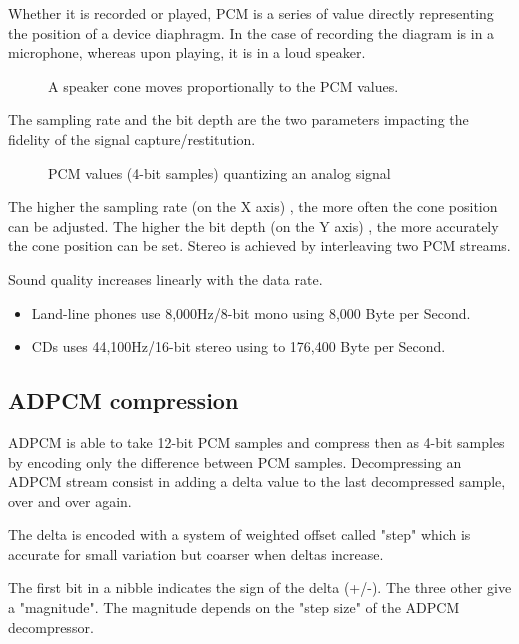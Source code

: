 Whether it is recorded or played, PCM is a series of value directly representing the position of a device diaphragm. In the case of recording the diagram is in a microphone, whereas upon playing, it is in a loud speaker.

\pagebreak

\begin{figure}[H]
\caption*{A speaker cone moves proportionally to the PCM values.}
\end{figure}


The sampling rate and the bit depth are the two parameters impacting the fidelity of the signal capture/restitution.

\begin{figure}[H]
\caption*{PCM values (4-bit samples) quantizing an analog signal}
\end{figure}


The higher the sampling rate (on the X axis) , the more often the cone position can be adjusted. The higher the bit depth (on the Y axis) , the more accurately the cone position can be set. Stereo is achieved by interleaving two PCM streams.





Sound quality increases linearly with the data rate.
\begin{itemize}[topsep=0pt]
\item Land-line phones use 8,000Hz/8-bit mono using 8,000 Byte per Second.
\item CDs uses 44,100Hz/16-bit stereo using to 176,400 Byte per Second.
\end{itemize}



\subsection{ADPCM compression}
ADPCM is able to take 12-bit PCM samples and compress then as 4-bit samples by encoding only the difference between PCM samples. Decompressing an ADPCM stream consist in adding a delta value to the last decompressed  sample, over and over again.

The delta is encoded with a system of weighted offset called "step" which is accurate for small variation but coarser when deltas increase. 

The first bit in a nibble indicates the sign of the delta (+/-). The three other give a "magnitude". The magnitude depends on the "step size" of the ADPCM decompressor.

